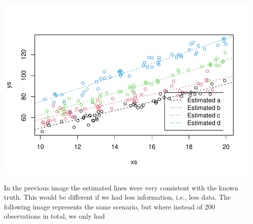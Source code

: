 \documentclass[
]{book}
\begin{document}
\includegraphics{ECOMODbook_files/figure-latex/a11.15-1.pdf}

In the previous image the estimated lines were very consistent with the known truth. This would be different if we had less information, i.e., less data. The following image represents the same scenario, but where instead of 200 observations in total, we only had
\end{document}
